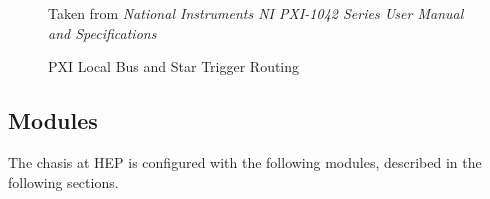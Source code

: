\begin{figure}[htbp]\begin{center}
  {\tiny
    Taken from \textit{National Instruments NI PXI-1042 Series User Manual and Specifications}
  }
  \caption{PXI Local Bus and Star Trigger Routing}
  \label{fig:eq_pxi:chasis_bus}
\end{center}\end{figure}

\subsection{Modules}
\label{sec:eq_pxi:modules}

The chasis at HEP is configured with the following modules, described in the following sections.

%


